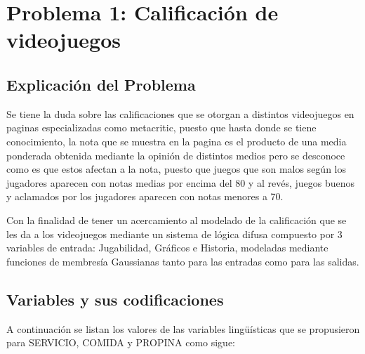 \documentclass[11pt, letterpaper]{article}
\begin{document}
\newpage


\section{Problema 1: Calificación de videojuegos}

\subsection{Explicación del Problema}

Se tiene la duda sobre las calificaciones que se otorgan a distintos videojuegos en paginas especializadas como metacritic, puesto que hasta donde se tiene conocimiento, la nota que se muestra en la pagina es el producto de una media ponderada obtenida mediante la opinión de distintos medios pero se desconoce como es que estos afectan a la nota, puesto que juegos que son malos según los jugadores aparecen con notas medias por encima del 80 y al revés, juegos buenos y aclamados por los jugadores aparecen con notas menores a 70.

Con la finalidad de tener un acercamiento al modelado de la calificación que se les da a los videojuegos mediante un sistema de lógica difusa compuesto por 3 variables de entrada: Jugabilidad, Gráficos e Historia, modeladas mediante funciones de membresía Gaussianas tanto para las entradas como para las salidas.


\subsection{Variables y sus codificaciones}

A continuación se listan los valores de las variables lingüísticas que se
propusieron para SERVICIO, COMIDA y PROPINA como sigue:
\end{document}
